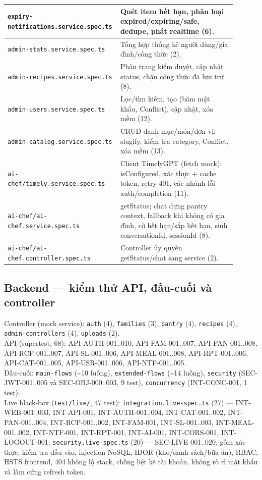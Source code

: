 \documentclass[12pt,a4paper]{article}
\newcommand{\code}[1]{\texttt{#1}}
\newcommand{\fpath}[1]{\nolinkurl{#1}}
\begin{document}
\begin{longtable}{|>{\raggedright\arraybackslash}p{0.40\linewidth}|>{\raggedright\arraybackslash}p{0.50\linewidth}|}
\hline
\fpath{expiry-notifications.service.spec.ts} & Quét item hết hạn, phân loại expired/expiring/safe, dedupe, phát realtime (6). \\
\hline
\fpath{admin-stats.service.spec.ts} & Tổng hợp thống kê người dùng/gia đình/công thức (2). \\
\hline
\fpath{admin-recipes.service.spec.ts} & Phân trang kiểm duyệt, cập nhật status, chặn công thức đã lưu trữ (8). \\
\hline
\fpath{admin-users.service.spec.ts} & Lọc/tìm kiếm, tạo (băm mật khẩu, Conflict), cập nhật, xóa mềm (12). \\
\hline
\fpath{admin-catalog.service.spec.ts} & CRUD danh mục/món/đơn vị: slugify, kiểm tra category, Conflict, xóa mềm (13). \\
\hline
\fpath{ai-chef/timely.service.spec.ts} & Client TimelyGPT (fetch mock): isConfigured, xác thực + cache token, retry 401, các nhánh lỗi auth/completion (11). \\
\hline
\fpath{ai-chef/ai-chef.service.spec.ts} & getStatus; chat dựng pantry context, fallback khi không có gia đình, cờ hết hạn/sắp hết hạn, sinh conversationId, sessionId (8). \\
\hline
\fpath{ai-chef/ai-chef.controller.spec.ts} & Controller ủy quyền getStatus/chat sang service (2). \\
\hline
\end{longtable}

\subsection{Backend --- kiểm thử API, đầu-cuối và controller}
Controller (mock service): \code{auth} (4), \code{families} (3), \code{pantry} (4), \code{recipes} (4),
\code{admin-controllers} (4), \code{uploads} (2). \\
API (supertest, 68): API-AUTH-001..010, API-FAM-001..007, API-PAN-001..008, API-RCP-001..007,
API-SL-001..006, API-MEAL-001..008, API-RPT-001..006, API-CAT-001..005, API-USR-001..006, API-NTF-001..005. \\
Đầu-cuối: \code{main-flows} (\textasciitilde 10 luồng), \code{extended-flows} (\textasciitilde 14 luồng),
\code{security} (SEC-JWT-001..005 và SEC-OBJ-000..003, 9 test), \code{concurrency} (INT-CONC-001, 1 test). \\
Live black-box (\code{test/live/}, 47 test):
\code{integration.live-spec.ts} (27) --- INT-WEB-001..003, INT-API-001, INT-AUTH-001..004, INT-CAT-001..002,
INT-PAN-001..004, INT-RCP-001..002, INT-FAM-001, INT-SL-001..003, INT-MEAL-001..002, INT-NTF-001, INT-RPT-001,
INT-AI-001, INT-CORS-001, INT-LOGOUT-001;
\code{security.live-spec.ts} (20) --- SEC-LIVE-001..020, gồm xác thực, kiểm tra đầu vào, injection NoSQL,
IDOR (kho/danh sách/bữa ăn), RBAC, HSTS frontend, 404 không lộ stack, chống liệt kê tài khoản, không rò rỉ
mật khẩu và làm cứng refresh token.
\end{document}
